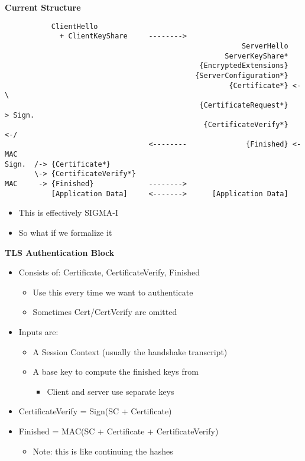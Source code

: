 \documentclass[helvetica]{seminar}
\newcommand{\heading}[1]{%
  \begin{center} 
    \large\bf 
    #1 
  \end{center} 
  \vspace{.4 in}}
\begin{document}
\begin{slide}
\heading{Current Structure}

\vspace{-3ex}
\begin{footnotesize}
\begin{verbatim}
           ClientHello
             + ClientKeyShare     -------->
                                                        ServerHello
                                                    ServerKeyShare*
                                              {EncryptedExtensions}
                                             {ServerConfiguration*}
                                                     {Certificate*} <-\
                                              {CertificateRequest*}    > Sign.
                                               {CertificateVerify*} <-/
                                  <--------              {Finished} <-   MAC
Sign.  /-> {Certificate*}
       \-> {CertificateVerify*}
MAC     -> {Finished}             -------->
           [Application Data]     <------->      [Application Data]
\end{verbatim}
\end{footnotesize}

\begin{itemize}
\item This is effectively SIGMA-I
\item So what if we formalize it
\end{itemize}
\end{slide}

\begin{slide}
\heading{TLS Authentication Block}

\begin{itemize}
\item Consists of: Certificate, CertificateVerify, Finished
  \begin{itemize}
  \item Use this every time we want to authenticate
  \item Sometimes Cert/CertVerify are omitted
  \end{itemize}

\item Inputs are:
  \begin{itemize}
  \item A Session Context (usually the handshake transcript)
  \item A base key to compute the finished keys from
    \begin{itemize}
    \item Client and server use separate keys
    \end{itemize}
  \end{itemize}

\item CertificateVerify = Sign(SC + Certificate)
\item Finished = MAC(SC + Certificate + CertificateVerify)
  \begin{itemize}
  \item Note: this is like continuing the hashes
  \end{itemize}
\end{itemize}
\end{slide}
\end{document}
